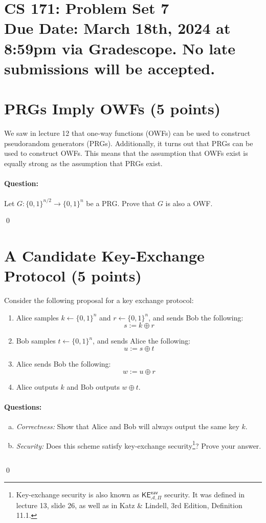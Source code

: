 \documentclass[11pt]{article}
\numberwithin{equation}{section}
\newcommand{\A}{\mathcal{A}}
\newcommand{\bin}{\{0,1\}}
\newcommand{\bit}{\bin}
\newcommand{\duedate}{March 18th, 2024 at 8:59pm via Gradescope. No late submissions will be accepted.}
\newenvironment{solution}{\color{blue}\noindent{\bf Solution}\hspace*{1em}}{\qed\medskip}
\begin{document}
\section*{CS 171: Problem Set 7\\ {\small Due Date: \duedate} }


\section{PRGs Imply OWFs (5 points)}
We saw in lecture 12 that one-way functions (OWFs) can be used to construct pseudorandom generators (PRGs). Additionally, it turns out that PRGs can be used to construct OWFs. This means that the assumption that OWFs exist is equally strong as the assumption that PRGs exist.

\paragraph{Question: } Let $G: \{0,1\}^{n/2} \to \{0,1\}^n$ be a PRG. Prove that $G$ is also a OWF.\\

\begin{solution}

\end{solution}

\pagebreak

\section{A Candidate Key-Exchange Protocol (5 points)}
Consider the following proposal for a key exchange protocol:
\begin{enumerate}
\item Alice samples $k \leftarrow \bit^n$ and $r \leftarrow \bit^n$, and sends Bob the following: 
\[s := k \oplus r\]
\item Bob samples $t \leftarrow \bit^n$, and sends Alice the following: 
\[u := s \oplus t\]
\item Alice sends Bob the following: 
\[w := u \oplus r\]
\item Alice outputs $k$ and Bob outputs $w \oplus t$.
\end{enumerate}

\paragraph{Questions:}

\begin{enumerate}[(a)]
    \item \emph{Correctness:} Show that Alice and Bob will always output the same key $k$.
    \item \emph{Security:} Does this scheme satisfy key-exchange security\footnote{Key-exchange security is also known as $\mathsf{KE}^{\mathsf{eav}}_{\A,\Pi}$ security. It was defined in lecture 13, slide 26, as well as in Katz \& Lindell, 3rd Edition, Definition 11.1.}? Prove your answer.
\end{enumerate}$ $

\begin{solution}
    
\end{solution}
\end{document}
